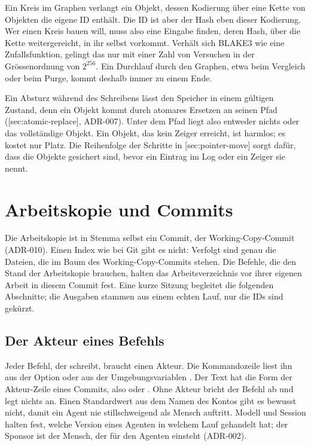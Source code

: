 Ein Kreis im Graphen verlangt ein Objekt, dessen Kodierung über eine Kette von Objekten
die eigene ID enthält. Die ID ist aber der Hash eben dieser Kodierung.
Wer einen Kreis bauen will, muss also eine Eingabe finden,
deren Hash, über die Kette weitergereicht, in ihr selbst vorkommt.
Verhält sich BLAKE3 wie eine Zufallsfunktion, gelingt das nur mit einer Zahl von Versuchen
in der Grössenordnung von $2^{256}$. Ein Durchlauf durch den Graphen,
etwa beim Vergleich oder beim Purge, kommt deshalb immer zu einem Ende.

Ein Absturz während des Schreibens lässt den Speicher in einem gültigen Zustand,
denn ein Objekt kommt durch atomares Ersetzen an seinen Pfad
([sec:atomic-replace], ADR-007).
Unter dem Pfad liegt also entweder nichts oder das vollständige Objekt.
Ein Objekt, das kein Zeiger erreicht, ist harmlos; es kostet nur Platz.
Die Reihenfolge der Schritte in [sec:pointer-move] sorgt dafür,
dass die Objekte gesichert sind, bevor ein Eintrag im Log oder ein Zeiger sie nennt.

\section{Arbeitskopie und Commits}

Die Arbeitskopie ist in Stemma selbst ein Commit, der Working-Copy-Commit (ADR-010).
Einen Index wie bei Git gibt es nicht:
Verfolgt sind genau die Dateien, die im Baum des Working-Copy-Commits stehen.
Die Befehle, die den Stand der Arbeitskopie brauchen,
halten das Arbeitsverzeichnis vor ihrer eigenen Arbeit in diesem Commit fest.
Eine kurze Sitzung begleitet die folgenden Abschnitte;
die Ausgaben stammen aus einem echten Lauf, nur die IDs sind gekürzt.

\subsection{Der Akteur eines Befehls}

Jeder Befehl, der schreibt, braucht einen Akteur.
Die Kommandozeile liest ihn aus der Option 
oder aus der Umgebungsvariablen .
Der Text hat die Form der Akteur-Zeile eines Commits,
also  oder .
Ohne Akteur bricht der Befehl ab und legt nichts an.
Einen Standardwert aus dem Namen des Kontos gibt es bewusst nicht,
damit ein Agent nie stillschweigend als Mensch auftritt.
Modell und Session halten fest, welche Version eines Agenten in welchem Lauf gehandelt hat;
der Sponsor ist der Mensch, der für den Agenten einsteht (ADR-002).

